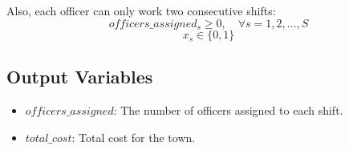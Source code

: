 \documentclass{article}
\begin{document}
Also, each officer can only work two consecutive shifts:
\[
officers\_assigned_{s} \geq 0, \quad \forall s = 1, 2, \ldots, S
\]
\[
x_s \in \{0, 1\}
\]

\subsection*{Output Variables}
\begin{itemize}
    \item $officers\_assigned$: The number of officers assigned to each shift.
    \item $total\_cost$: Total cost for the town.
\end{itemize}
\end{document}
